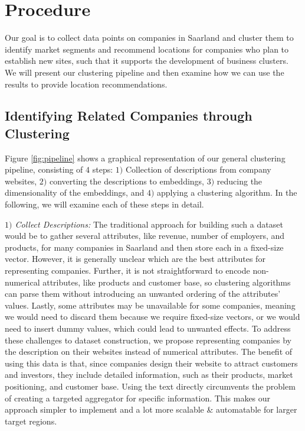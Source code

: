 \documentclass[conference]{IEEEtran}
\begin{document}
\section{Procedure}


Our goal is to collect data points on companies in Saarland and cluster them to identify market segments and recommend locations for companies who plan to establish new sites, such that it supports the development of business clusters. We will present our clustering pipeline and then examine how we can use the results to provide location recommendations. 

\subsection{Identifying Related Companies through Clustering}
Figure \ref{fig:pipeline} shows a graphical representation of our general clustering pipeline, consisting of $4$ steps: $1)$ Collection of descriptions from company websites, $2)$ converting the descriptions to embeddings, $3)$ reducing the dimensionality of the embeddings, and $4)$ applying a clustering algorithm. In the following, we will examine each of these steps in detail.

\textit{$1)$ Collect Descriptions:} The traditional approach for building such a dataset would be to gather several attributes, like revenue, number of employers, and products, for many companies in Saarland and then store each in a fixed-size vector. However, it is generally unclear which are the best attributes for representing companies. Further, it is not straightforward to encode non-numerical attributes, like products and customer base, so clustering algorithms can parse them without introducing an unwanted ordering of the attributes' values. 
Lastly, some attributes may be unavailable for some companies, meaning we would need to discard them because we require fixed-size vectors, or we would need to insert dummy values, which could lead to unwanted effects.
To address these challenges to dataset construction, we propose representing companies by the description on their websites instead of numerical attributes. The benefit of using this data is that, since companies design their website to attract customers and investors, they include detailed information, such as their products, market positioning, and customer base. Using the text directly circumvents the problem of creating a targeted aggregator for specific information. This makes our approach simpler to implement and a lot more scalable \& automatable for larger target regions. 
\end{document}
